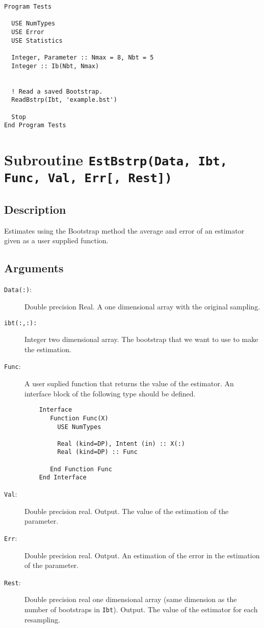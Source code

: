 \begin{lstlisting}[emph=ReadBstrp,
                   emphstyle=\color{blue},
                   frame=trBL,
                   caption=Saving the resampling info.,
                   label=ReadBstrp]
Program Tests

  USE NumTypes
  USE Error
  USE Statistics

  Integer, Parameter :: Nmax = 8, Nbt = 5
  Integer :: Ib(Nbt, Nmax)


  ! Read a saved Bootstrap.
  ReadBstrp(Ibt, 'example.bst')

  Stop
End Program Tests
\end{lstlisting}

\section{Subroutine \texttt{EstBstrp(Data, Ibt, Func, Val, Err[, Rest])}}

\subsection{Description}

Estimates using the Bootstrap method the average and error of an
estimator given as a user supplied function.

\subsection{Arguments}

\begin{description}
\item[\texttt{Data(:)}:] Double precision Real. A one dimensional
  array with the original sampling.
\item[\texttt{ibt(:,:): }] Integer two dimensional array. The bootstrap
  that we want to use to make the estimation.
\item[\texttt{Func}: ] A user suplied function that returns the value
  of the estimator. An interface block of the following type should be
  defined. 
\begin{verbatim}
    Interface 
       Function Func(X)
         USE NumTypes
         
         Real (kind=DP), Intent (in) :: X(:)
         Real (kind=DP) :: Func

       End Function Func
    End Interface
\end{verbatim}
\item[\texttt{Val}: ] Double precision real. Output. The value of the 
  estimation of the parameter. 
\item[\texttt{Err}: ] Double precision real. Output. An estimation of
  the error in the estimation of the parameter. 
\item[\texttt{Rest}: ] Double precision real one dimensional array
  (same dimension as the number of bootstraps in
  \texttt{Ibt}). Output. The value of the estimator for each
  resampling. 
\end{description}

